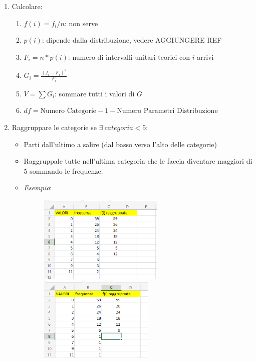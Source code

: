 \begin{enumerate}
    \item Calcolare:
          \begin{enumerate}
              \item $f(i) = f_i / n$: non serve %
              \item $p(i)$: dipende dalla distribuzione, vedere AGGIUNGERE REF
              \item $F_i = n * p(i)$: numero di intervalli unitari teorici con
                    $i$ arrivi
              \item $G_i = \frac{(f_i - F_i)^2}{F_i}$
              \item $V = \sum G_i$: sommare tutti i valori di $G$
              \item $df = \text{Numero Categorie} - 1 - \text{Numero Parametri
                            Distribuzione}$
          \end{enumerate}
    \item Raggruppare le categorie se $\exists \ categoria < 5$:
          \begin{itemize}
              \item Parti dall'ultimo a salire (dal basso verso l'alto delle
                    categorie)
              \item Raggruppale tutte nell'ultima categoria che le faccia
                    diventare maggiori di 5 sommando le frequenze.
              \item \textit{Esempio}:
                    \begin{figure}[H]
                        \centering
                        \includegraphics[width=6cm, keepaspectratio]{capitoli/goodnes_of_fit/imgs/vesceragay.png}
                        \includegraphics[width=5.5cm, keepaspectratio]{capitoli/goodnes_of_fit/imgs/POSTAMOLTOGAY.png}
                    \end{figure}
          \end{itemize}


\end{enumerate}